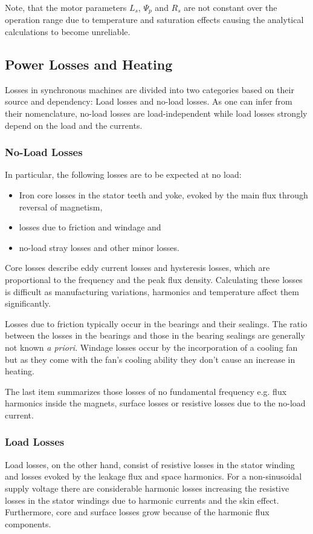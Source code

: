 Note, that the motor parameters $L_s$, $\Psi_p$ and $R_s$ are not constant over the operation range due to temperature and saturation effects causing the analytical calculations to become unreliable.

\subsection{Power Losses and Heating}
\label{ssec:pmsm_loss_heating}
Losses in synchronous machines  are divided into two categories based on their source and dependency: Load losses and no-load losses.
As one can infer from their nomenclature, no-load losses are load-independent while load losses strongly depend on the load and the currents.

\subsubsection{No-Load Losses}
In particular, the following losses are to be expected at no load:
\begin{itemize}
	\item Iron core losses in the stator teeth and yoke, evoked by the main flux through reversal of magnetism,
	\item losses due to friction and windage and
	\item no-load stray losses and other minor losses.
\end{itemize}
Core losses describe eddy current losses and hysteresis losses, which are proportional to the frequency and the peak flux density.
Calculating these losses is difficult as manufacturing variations, harmonics and temperature affect them significantly.

Losses due to friction typically occur in the bearings and their sealings.
The ratio between the losses in the bearings and those in the bearing sealings are generally not known \textit{a priori}.
Windage losses occur by the incorporation of a cooling fan but as they come with the fan's cooling ability they don't cause an increase in heating.

The last item summarizes those losses of no fundamental frequency e.g. flux harmonics inside the magnets, surface losses or resistive losses due to the no-load current. 

\subsubsection{Load Losses}
Load losses, on the other hand, consist of resistive losses in the stator winding and losses evoked by the leakage flux and space harmonics.
For a non-sinusoidal supply voltage there are considerable harmonic losses increasing the resistive losses in the stator windings due to harmonic currents and the skin effect.
Furthermore, core and surface losses grow because of the harmonic flux components.

